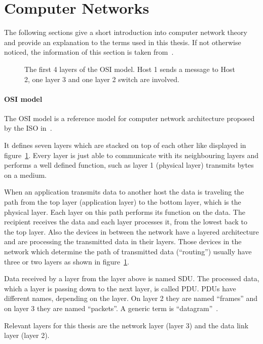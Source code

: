 \section{Computer Networks}
The following sections give a short introduction into computer network theory and provide an explanation to the terms used in this thesis.
If not otherwise noticed, the information of this section is taken from~\cite{tanenbaum2011networks}.

\begin{figure}
  \centering
  \def\svgwidth{\columnwidth}
  
  \caption[\acrshort{OSI} Model]{The first 4 layers of the \gls{OSI} model. Host 1 sends a message to Host 2, one layer 3 and one layer 2 switch are involved.}
  \label{fig:osi}
\end{figure}

\paragraph{OSI model}
The \gls{OSI} model is a reference model for computer network architecture proposed by the \gls{ISO} in~\cite{isoosi1994}.

It defines seven layers which are stacked on top of each other like displayed in figure~\ref{fig:osi}.
Every layer is just able to communicate with its neighbouring layers and performs a well defined function, such as layer 1 (physical layer) transmits bytes on a medium.

When an application transmits data to another host the data is traveling the path from the top layer (application layer) to the bottom layer, which is the physical layer.
Each layer on this path performs its function on the data.
The recipient receives the data and each layer processes it, from the lowest back to the top layer.
Also the devices in between the network have a layered architecture and are processing the transmitted data in their layers.
Those devices in the network which determine the path of transmitted data (``routing'') usually have three or two layers as shown in figure~\ref{fig:osi}.

Data received by a layer from the layer above is named \gls{SDU}.
The processed data, which a layer is passing down to the next layer, is called \gls{PDU}.
\glspl{PDU} have different names, depending on the layer.
On layer 2 they are named ``frames'' and on layer 3 they are named ``packets''.
 A generic term is ``datagram''~\cite{RFC1594}.

Relevant layers for this thesis are the network layer (layer 3) and the data link layer (layer 2).

